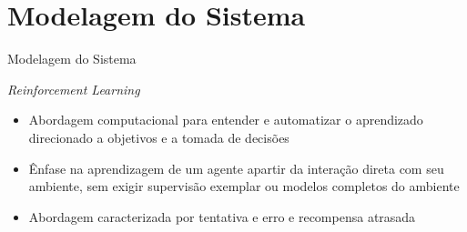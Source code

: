 \documentclass[aspectratio=169]{beamer}
\begin{document}
\section{Modelagem do Sistema}

\begin{frame}{Modelagem do Sistema}
	\begin{block}{\textit{Reinforcement Learning}}
		\begin{itemize}
			\item Abordagem computacional para entender e automatizar o aprendizado direcionado a objetivos e a tomada de decisões
			\item Ênfase na aprendizagem de um agente apartir da interação direta com seu ambiente, sem exigir supervisão exemplar ou modelos completos do ambiente
			\item Abordagem caracterizada por tentativa e erro e recompensa atrasada
		\end{itemize}
	\end{block}
\end{frame}
\end{document}
